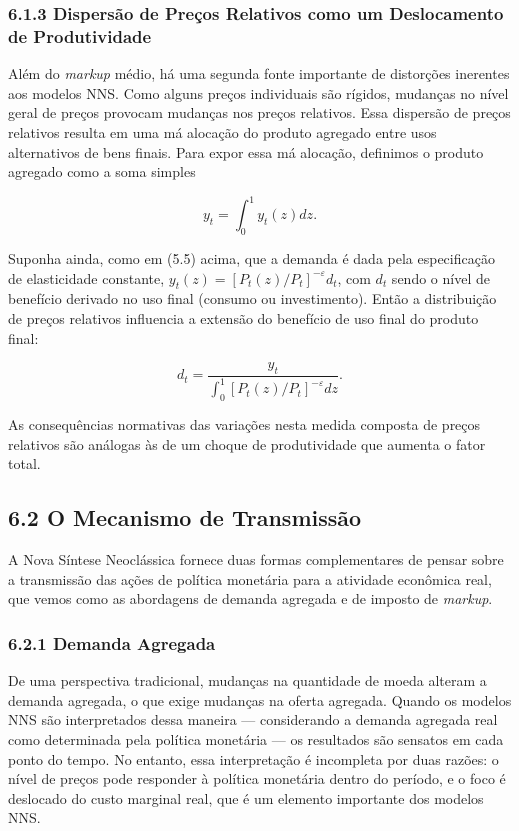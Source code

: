 \documentclass[12pt]{article}
\begin{document}
\subsubsection{6.1.3 Dispersão de Preços Relativos como um Deslocamento de Produtividade} Além do \textit{markup} médio, há uma segunda fonte importante de distorções inerentes aos modelos NNS. Como alguns preços individuais são rígidos, mudanças no nível geral de preços provocam mudanças nos preços relativos. Essa dispersão de preços relativos resulta em uma má alocação do produto agregado entre usos alternativos de bens finais. Para expor essa má alocação, definimos o produto agregado como a soma simples

\begin{equation}
y_t = \int_0^1 y_t(z) dz.
\end{equation}

Suponha ainda, como em (5.5) acima, que a demanda é dada pela especificação de elasticidade constante, $y_t(z) = [P_t(z)/P_t]^{-\varepsilon} d_t$, com $d_t$ sendo o nível de benefício derivado no uso final (consumo ou investimento). Então a distribuição de preços relativos influencia a extensão do benefício de uso final do produto final:

\begin{equation}
d_t = \frac{y_t}{\int_0^1 [P_t(z)/P_t]^{-\varepsilon} dz}.
\end{equation}

As consequências normativas das variações nesta medida composta de preços relativos são análogas às de um choque de produtividade que aumenta o fator total.

\subsection{6.2 O Mecanismo de Transmissão}

A Nova Síntese Neoclássica fornece duas formas complementares de pensar sobre a transmissão das ações de política monetária para a atividade econômica real, que vemos como as abordagens de demanda agregada e de imposto de \textit{markup}.

\subsubsection{6.2.1 Demanda Agregada} De uma perspectiva tradicional, mudanças na quantidade de moeda alteram a demanda agregada, o que exige mudanças na oferta agregada. Quando os modelos NNS são interpretados dessa maneira — considerando a demanda agregada real como determinada pela política monetária — os resultados são sensatos em cada ponto do tempo. No entanto, essa interpretação é incompleta por duas razões: o nível de preços pode responder à política monetária dentro do período, e o foco é deslocado do custo marginal real, que é um elemento importante dos modelos NNS.
\end{document}

